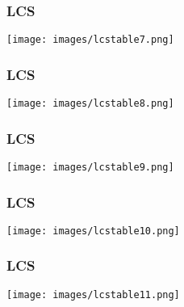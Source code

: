 \documentclass[12pt,pdf,hyperref={unicode}]{beamer}
\begin{document}
\begin{frame}[fragile]
\frametitle{LCS} 
\begin{center}
\texttt{[image: images/lcstable7.png]}
\end{center}
\end{frame}

\begin{frame}[fragile]
\frametitle{LCS} 
\begin{center}
\texttt{[image: images/lcstable8.png]}
\end{center}
\end{frame}

\begin{frame}[fragile]
\frametitle{LCS} 
\begin{center}
\texttt{[image: images/lcstable9.png]}
\end{center}
\end{frame}

\begin{frame}[fragile]
\frametitle{LCS} 
\begin{center}
\texttt{[image: images/lcstable10.png]}
\end{center}
\end{frame}

\begin{frame}[fragile]
\frametitle{LCS} 
\begin{center}
\texttt{[image: images/lcstable11.png]}
\end{center}
\end{frame}
\end{document}
